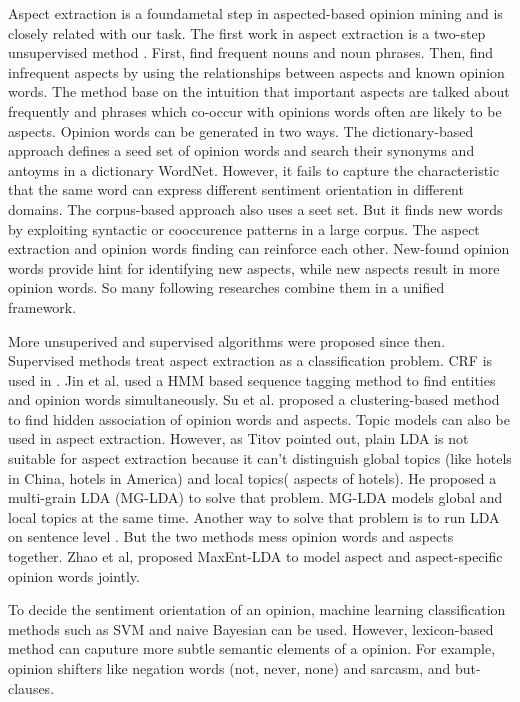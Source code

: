 \documentclass{article}
\begin{document}
Aspect extraction is a foundametal step in aspected-based opinion mining and is closely related with our task. The first work in aspect extraction is a two-step unsupervised method \cite{hu2004mining}. First, find frequent nouns and noun phrases. Then, find infrequent aspects by using the relationships between aspects and known opinion words. The method base on the intuition that important aspects are talked about frequently and phrases which co-occur with opinions words often are likely to be aspects. Opinion words can be generated in two ways. The dictionary-based approach defines a seed set of opinion words and search their synonyms and antoyms in a dictionary WordNet. However, it fails to capture the characteristic that the same word can express different sentiment orientation in different domains. The corpus-based approach also uses a seet set. But it finds new words by exploiting syntactic or cooccurence patterns in a large corpus\cite{hatzivassiloglou1997predicting}. The aspect extraction and opinion words finding can reinforce each other. New-found opinion words provide hint for identifying new aspects, while new aspects result in more opinion words. So many following researches combine them in a unified framework. 

More unsuperived and supervised algorithms were proposed since then. Supervised methods treat aspect extraction as a classification problem. CRF is used in \cite{jakob2010extracting}. Jin et al. \cite{jin2009opinionminer} used a HMM based sequence tagging method to find entities and opinion words simultaneously. Su et al. \cite{su2008hidden} proposed a clustering-based method to find hidden association of opinion words and aspects. Topic models can also be used in aspect extraction. However, as Titov\cite{titov2008modeling} pointed out, plain LDA is not suitable for aspect extraction because it can't distinguish global topics (like hotels in China, hotels in America) and local topics( aspects of hotels). He proposed a multi-grain LDA (MG-LDA) to solve that problem. MG-LDA models global and local topics at the same time. Another way to solve that problem is to run LDA on sentence level \cite{brody2010unsupervised}. But the two methods mess opinion words and aspects together. Zhao et al, \cite{zhao2010jointly} proposed MaxEnt-LDA to model aspect and aspect-specific opinion words jointly.

To decide the sentiment orientation of an opinion, machine learning classification methods such as SVM and naive Bayesian can be used. However, lexicon-based method can caputure more subtle semantic elements of a opinion\cite{ding2008holistic}. For example, opinion shifters like negation words (not, never, none) and sarcasm, and but-clauses. 
\end{document}

